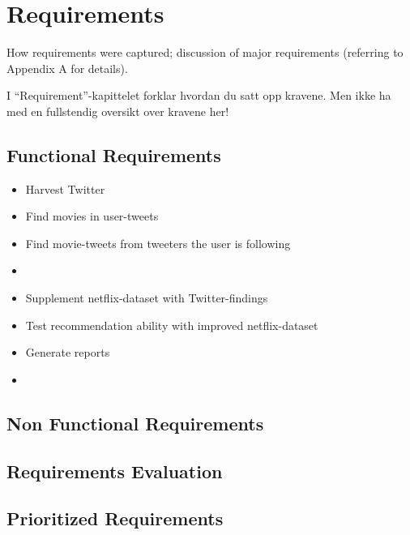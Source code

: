 \chapter{Requirements}

\minitoc

How requirements  were  captured;
  discussion  of  major requirements
(referring  to  Appendix  A for details).

I “Requirement”-kapittelet forklar hvordan du satt opp kravene.
Men ikke ha med en fullstendig oversikt over kravene her!

\clearpage


\section{Functional Requirements}

\begin{itemize}
  \item Harvest Twitter
  \item Find movies in user-tweets
  \item Find movie-tweets from tweeters the user is following
  \item
  \item Supplement netflix-dataset with Twitter-findings
  \item Test recommendation ability with improved netflix-dataset
  \item Generate reports
  \item
\end{itemize}


\section{Non Functional Requirements}


\section{Requirements Evaluation}


\section{Prioritized Requirements}


